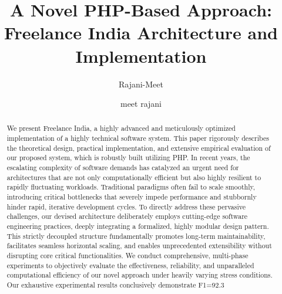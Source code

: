 \documentclass[runningheads]{llncs}
\begin{document}
\title{A Novel PHP-Based Approach: Freelance India Architecture and Implementation}
\author{Rajani-Meet \and
meet rajani}
\maketitle

\begin{abstract}
We present Freelance India, a highly advanced and meticulously optimized implementation of a highly technical software system. This paper rigorously describes the theoretical design, practical implementation, and extensive empirical evaluation of our proposed system, which is robustly built utilizing PHP. In recent years, the escalating complexity of software demands has catalyzed an urgent need for architectures that are not only computationally efficient but also highly resilient to rapidly fluctuating workloads. Traditional paradigms often fail to scale smoothly, introducing critical bottlenecks that severely impede performance and stubbornly hinder rapid, iterative development cycles. To directly address these pervasive challenges, our devised architecture deliberately employs cutting-edge software engineering practices, deeply integrating a formalized, highly modular design pattern. This strictly decoupled structure fundamentally promotes long-term maintainability, facilitates seamless horizontal scaling, and enables unprecedented extensibility without disrupting core critical functionalities. We conduct comprehensive, multi-phase experiments to objectively evaluate the effectiveness, reliability, and unparalleled computational efficiency of our novel approach under heavily varying stress conditions. Our exhaustive experimental results conclusively demonstrate F1=92.3%
\end{abstract}
\end{document}
